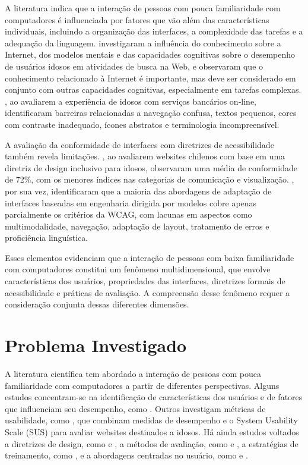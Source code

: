 A literatura indica que a interação de pessoas com pouca familiaridade com computadores é influenciada por fatores que vão além das características individuais, incluindo a organização das interfaces, a complexidade das tarefas e a adequação da linguagem. \cite{sharit2008information} investigaram a influência do conhecimento sobre a Internet, dos modelos mentais e das capacidades cognitivas sobre o desempenho de usuários idosos em atividades de busca na Web, e observaram que o conhecimento relacionado à Internet é importante, mas deve ser considerado em conjunto com outras capacidades cognitivas, especialmente em tarefas complexas. \cite{gatsou2017seniors}, ao avaliarem a experiência de idosos com serviços bancários on-line, identificaram barreiras relacionadas a navegação confusa, textos pequenos, cores com contraste inadequado, ícones abstratos e terminologia incompreensível.

A avaliação da conformidade de interfaces com diretrizes de acessibilidade também revela limitações. \cite{dombrovskaia2021guideline}, ao avaliarem websites chilenos com base em uma diretriz de design inclusivo para idosos, observaram uma média de conformidade de 72\%, com os menores índices nas categorias de comunicação e visualização. \cite{wickramathilaka2023addressing}, por sua vez, identificaram que a maioria das abordagens de adaptação de interfaces baseadas em engenharia dirigida por modelos cobre apenas parcialmente os critérios da WCAG, com lacunas em aspectos como multimodalidade, navegação, adaptação de layout, tratamento de erros e proficiência linguística.

Esses elementos evidenciam que a interação de pessoas com baixa familiaridade com computadores constitui um fenômeno multidimensional, que envolve características dos usuários, propriedades das interfaces, diretrizes formais de acessibilidade e práticas de avaliação. A compreensão desse fenômeno requer a consideração conjunta dessas diferentes dimensões.

\section{Problema Investigado}

A literatura científica tem abordado a interação de pessoas com pouca familiaridade com computadores a partir de diferentes perspectivas. Alguns estudos concentram-se na identificação de características dos usuários e de fatores que influenciam seu desempenho, como \cite{sharit2008information}. Outros investigam métricas de usabilidade, como \cite{weighted_heuristic}, que combinam medidas de desempenho e o System Usability Scale (SUS) para avaliar websites destinados a idosos. Há ainda estudos voltados a diretrizes de design, como \cite{kurniawan2005research} e \cite{sun2010preliminary}, a métodos de avaliação, como \cite{filgueiras2009recoverability} e \cite{taylor2009using}, a estratégias de treinamento, como \cite{cowan2011exploring}, e a abordagens centradas no usuário, como \cite{balakrishnan2012user} e \cite{breaking_barriers}.

